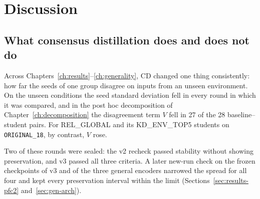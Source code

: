 \chapter{Discussion}
\label{ch:discussion}

\section{What consensus distillation does and does not do}
\label{sec:disc-does}

Across Chapters~\ref{ch:results}--\ref{ch:generality}, CD changed one
thing consistently: how far the seeds of one group disagree on
inputs from an unseen environment. On the unseen conditions the seed
standard deviation fell in every round in which it was compared, and in
the post hoc decomposition of Chapter~\ref{ch:decomposition} the
disagreement term $V$ fell in 27 of the 28 baseline--student pairs. For
REL\_GLOBAL and its KD\_ENV\_TOP5 students on \texttt{ORIGINAL\_18}, by
contrast, $V$ rose.

Two of these rounds were sealed: the v2 recheck passed stability
without showing preservation, and v3 passed all three criteria. A later
new-run check on the frozen checkpoints of v3 and of the three general
encoders narrowed the spread for all four and kept every preservation
interval within the limit (Sections~\ref{sec:results-pfc2}
and~\ref{sec:gen-arch}).

